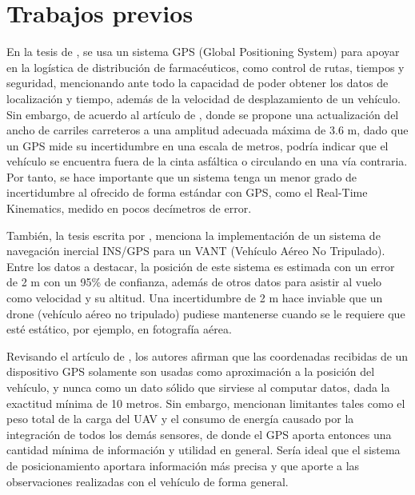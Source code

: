 \section{Trabajos previos}
En la tesis de \cite{de2011diseno}, se usa un sistema GPS (Global Positioning System\footnotemark) para apoyar en la logística de distribución de farmacéuticos, como control de rutas, tiempos y seguridad, mencionando ante todo la capacidad de poder obtener los datos de localización y tiempo, además de la velocidad de desplazamiento de un vehículo. Sin embargo, de acuerdo al artículo de \cite{mendoza2004recomendaciones}, donde se propone una actualización del ancho de carriles carreteros a una amplitud adecuada máxima de 3.6 m, dado que un GPS mide su incertidumbre en una escala de metros, podría indicar que el vehículo se encuentra fuera de la cinta asfáltica o circulando en una vía contraria. Por tanto, se hace importante que un sistema tenga un menor grado de incertidumbre al ofrecido de forma estándar con GPS, como el Real-Time Kinematics, medido en pocos decímetros de error. \\


También, la tesis escrita por \cite{ronnback2000developement}, menciona la implementación de un sistema de navegación inercial INS/GPS para un VANT (Vehículo Aéreo No Tripulado\footnotemark). Entre los datos a destacar, la posición de este sistema es estimada con un error de 2 m con un 95\% de confianza, además de otros datos para asistir al vuelo como velocidad y su altitud. Una incertidumbre de 2 m hace inviable que un drone (vehículo aéreo no tripulado) pudiese mantenerse cuando se le requiere que esté estático, por ejemplo, en fotografía aérea.\\


Revisando el artículo de \cite{maldonado2010controlador}, los autores afirman que las coordenadas recibidas de un dispositivo GPS solamente son usadas como aproximación a la posición del vehículo, y nunca como un dato sólido que sirviese al computar datos, dada la exactitud mínima de 10 metros. Sin embargo, mencionan limitantes tales como el peso total de la carga del UAV y el consumo de energía causado por la integración de todos los demás sensores, de donde el GPS aporta entonces una cantidad mínima de información y utilidad en general. Sería ideal que el sistema de posicionamiento aportara información más precisa y que aporte a las observaciones realizadas con el vehículo de forma general.\\


